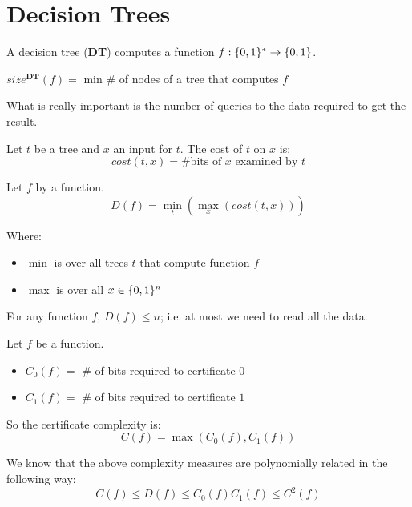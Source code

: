 \section{Decision Trees}\label{sec:dec_tree}

\def\dt{\textbf{DT}}
\def\sizedt{size^{\dt}}

A decision tree (\dt) computes a function $f : \{ 0,1 \}^* \rightarrow \{ 0,1 \}$.

$\sizedt(f) = $ min \# of nodes of a tree that computes $f$

What is really important is the number of queries to the data required to get the result.

\begin{definition}\label{def:tree_cost}
    Let $t$ be a tree and $x$ an input for $t$.
    The cost of $t$ on $x$ is:
    \[ cost(t,x) = \text{\# bits of } x \text{ examined by } t \]
\end{definition}

\begin{definition}\label{def:dt_complexity}
    Let $f$ by a function.
    \[ D(f) = \min_t ( \max_x (cost(t,x))) \]

    Where:
    \begin{itemize}
        \item $\min$ is over all trees $t$ that compute function $f$
        \item $\max$ is over all $x \in \{ 0,1 \}^n$
    \end{itemize}
\end{definition}

For any function $f$, $D(f) \leq n$; i.e. at most we need to read all the data.

\begin{definition}\label{def:certificate_compl}
    Let $f$ be a function.
    \begin{itemize}
        \item $C_0(f) =$ \# of bits required to certificate $0$
        \item $C_1(f) =$ \# of bits required to certificate $1$
    \end{itemize}

    So the certificate complexity is:
    \[ C(f) = \max(C_0(f), C_1(f)) \]
\end{definition}

We know that the above complexity measures are polynomially related in the following way:
\[ C(f) \leq D(f) \leq C_0(f) C_1(f) \leq C^2(f) \]


